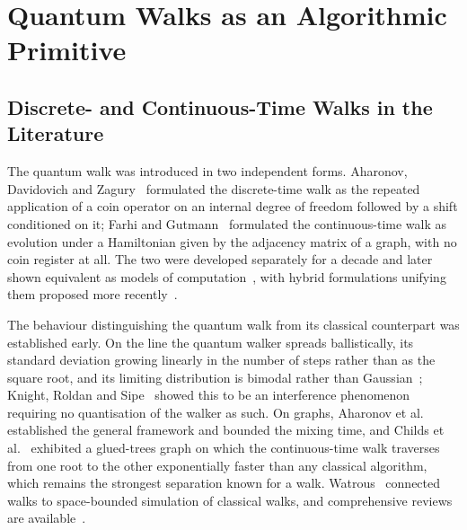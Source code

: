 \section{Quantum Walks as an Algorithmic Primitive}
\label{sec:lr-primitive}

\subsection{Discrete- and Continuous-Time Walks in the Literature}
The quantum walk was introduced in two independent forms. Aharonov, Davidovich
and Zagury~\cite{Aharonov_1993} formulated the discrete-time walk as the
repeated application of a coin operator on an internal degree of freedom
followed by a shift conditioned on it; Farhi and Gutmann~\cite{Farhi_1997}
formulated the continuous-time walk as evolution under a Hamiltonian given by
the adjacency matrix of a graph, with no coin register at all. The two were
developed separately for a decade and later shown equivalent as models of
computation~\cite{Childs2010, strauch2006connecting}, with hybrid formulations
unifying them proposed more recently~\cite{chen2025hybrid}.

The behaviour distinguishing the quantum walk from its classical counterpart was
established early. On the line the quantum walker spreads ballistically, its
standard deviation growing linearly in the number of steps rather than as the
square root, and its limiting distribution is bimodal rather than
Gaussian~\cite{Ambainis_2001, Konno_2002, Grimmett_2003}; Knight, Roldan and
Sipe~\cite{Knight_2003} showed this to be an interference phenomenon requiring
no quantisation of the walker as such. On graphs, Aharonov et
al.~\cite{Aharonov_2000} established the general framework and bounded the
mixing time, and Childs et al.~\cite{Childs_2001, Childs_2002} exhibited a
glued-trees graph on which the continuous-time walk traverses from one root to
the other exponentially faster than any classical algorithm, which remains the
strongest separation known for a walk. Watrous~\cite{Watrous_2001} connected
walks to space-bounded simulation of classical walks, and comprehensive reviews
are available~\cite{Elias_2012, Kadian_2021, Xiaogang_2024, Mlken_2011}.


